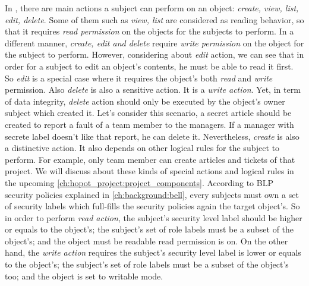 In \myProject, there are main actions a subject can perform on an object: \emph{create, view, list, edit, delete}.
Some of them such as \emph{view, list} are considered as reading behavior, so that it requires \emph{read permission} on the objects for the subjects to perform.
In a different manner, \emph{create, edit and delete} require \emph{write permission} on the object for the subject to perform.
However, considering about \emph{edit} action, we can see that in order for a subject to edit an object's contents, he must be able to read it first.
So \emph{edit} is a special case where it requires the object's both \emph{read} and \emph{write} permission.
Also \emph{delete} is also a sensitive action.
It is a \emph{write action}.
Yet, in term of data integrity, \emph{delete} action should only be executed by the object's owner \ie subject which created it.
Let's consider this scenario, a secret article should be created to report a fault of a team member to the managers.
If a manager with secrete label doesn't like that report, he can delete it.
Nevertheless, \emph{create} is also a distinctive action.
It also depends on other logical rules for the subject to perform.
For example, only team member can create articles and tickets of that project.
We will discuss about these kinds of special actions and logical rules in the upcoming \autoref{ch:hopot_project:project_components}.
According to BLP security policies explained in \autoref{ch:background:bell}, every subjects must own a set of security labels which full-fills the security policies again the target object's.
So in order to perform \emph{read action}, the subject's security level label should be higher or equals to the object's;
the subject's set of role labels must be a subset of the object's;
and the object must be readable \ie read permission is on.
On the other hand, the \emph{write action} requires the subject's security level label is lower or equals to the object's;
the subject's set of role labels must be a subset of the object's too;
and the object is set to writable mode.


